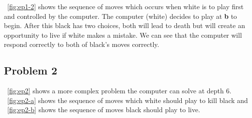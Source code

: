 \documentclass{l4proj}
\newcommand{\bo}[1]{\textbf{#1}}
\begin{document}
~\autoref{fig:ep1-2} shows the sequence of moves which occurs when white is to play first and controlled by the computer. The computer (white) decides to play at \bo{b} to begin. After this black has two choices, both will lead to death but will create an opportunity to live if white makes a mistake. We can see that the computer will respond correctly to both of black’s moves correctly.

\subsection{Problem 2}
~\autoref{fig:ep2} shows a more complex problem the computer can solve at depth 6. ~\autoref{fig:ep2-a} shows the sequence of moves which white should play to kill black and ~\autoref{fig:ep2-b} shows the sequence of moves black should play to live.
\end{document}
